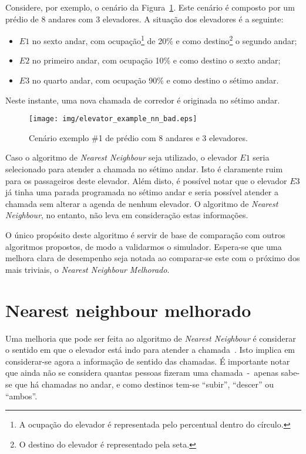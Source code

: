 Considere, por exemplo, o cenário da Figura~\ref{fig:elevadores:nn:bad}. Este
cenário é composto por um prédio de 8 andares com 3 elevadores. A situação dos
elevadores é a seguinte:

\begin{itemize}
\item $E1$ no sexto andar, com ocupação\footnote{A ocupação do elevador é representada pelo percentual dentro do círculo.} de 20\% e como destino\footnote{O destino do elevador é representado pela seta.} o segundo andar;
\item $E2$ no primeiro andar, com ocupação 10\% e como destino o sexto andar;
\item $E3$ no quarto andar, com ocupação 90\% e como destino o sétimo andar.
\end{itemize}

Neste instante, uma nova chamada de corredor é originada no sétimo andar.

\begin{figure}[htb!]
  \centering
  \texttt{[image: img/elevator\_example\_nn\_bad.eps]}
  \caption{Cenário exemplo \#1 de prédio com 8 andares e 3 elevadores.}
\label{fig:elevadores:nn:bad}
\end{figure}

Caso o algoritmo de \textit{Nearest Neighbour} seja utilizado, o elevador $E1$
seria selecionado para atender a chamada no sétimo andar. Isto é claramente ruim
para os passageiros deste elevador. Além disto, é possível notar que o elevador
$E3$ já tinha uma parada programada no sétimo andar e seria possível atender a
chamada sem alterar a agenda de nenhum elevador. O algoritmo de \textit{Nearest
Neighbour}, no entanto, não leva em consideração estas informações.

O único propósito deste algoritmo é servir de base de comparação com outros
algoritmos propostos, de modo a validarmos o simulador. Espera-se que uma
melhora clara de desempenho seja notada ao comparar-se este com o próximo dos
mais triviais, o \textit{Nearest Neighbour Melhorado}.

\section{\label{sec:ai:nnm}Nearest neighbour melhorado}

Uma melhoria que pode ser feita ao algoritmo de \textit{Nearest Neighbour} é
considerar o sentido em que o elevador está indo para atender a
chamada~\cite{Friese20061908}. Isto implica em considerar-se agora a informação
de sentido das chamadas. É importante notar que ainda não se considera quantas
pessoas fizeram uma chamada~-~apenas sabe-se que há chamadas no andar, e como
destinos tem-se ``subir'', ``descer'' ou ``ambos''.

